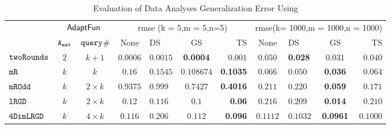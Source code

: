 {\footnotesize
\begin {table}[t]
        \vspace{-0.5cm}
        \caption{Evaluation of Data Analyses Generalization Error Using {\THESYSTEM}}
    \vspace{-0.4cm}
        \label{tb:adapt-generalization}
        \begin{center}
        \centering
{
        \begin{tabular}{|| >{\tiny}l || c | c || c | l | c | r || c | l | c | r || }
                \hhline{t|:=========== :t:|}
        \multirow{2}{*}{Program $c$}
         & \multicolumn{2}{c||}{$\textsf{AdaptFun}$}
         & \multicolumn{4}{c||}{rmse (k = 5,m = 5,n=5)}  & \multicolumn{4}{c||}{rmse(k= 1000,m = 1000,n = 1000)}  \\ 
         \hhline{||~--||----||----||}
         & {${\mathtt{A_{est}}}$ } & {${\tt query}$\# }  & None  & DS & GS & TS & None & DS & GS & TS \\ 
         \hline \hline
        $  \mathtt{ twoRounds }$ & $ 2 $ & $  k + 1 $  & $0.0006$   & {{$0.0015$}} & \textbf{0.0004} & {$0.001$}& $0.050$   & {\textbf{0.028}} & {$0.031$} & $0.040$  \\
        \hhline{||-||---||-||--||----||}
         $  \mathtt{ mR}$ & $k$ & $k$  & $0.16$   & $0.1545$  & $0.108674 $ & \textbf{0.1035}  & $0.066$   & $0.050$ & {\textbf{0.036}} & $0.064$  \\
         \hhline{||-||---||-||--||----||}
         $  \mathtt{ mROdd }$ & $ k $   & $  2 \times k $ & $0.9375$   & $0.999$ & $0.7427$ & {\textbf{0.4016}} & $0.211$   & $0.220$ & {\textbf{0.059}} & $0.171$  \\
         \hhline{||-||---||-||--||----||}
         $  \mathtt{ lRGD }$ & $ k $ & $  2\times k $  & $0.12$   & $0.116$ & $ 0.1 $ & \textbf{0.06} & $0.216$   & $0.209$ & \textbf{0.014} & $0.210$  \\
         \hhline{||-||---||-||--||----||}
         $  \mathtt{ 4DimLRGD }$ & $ k $ & $  4\times k $   & $0.116$   & $0.206$ & $0.112 $ & \textbf{0.096} & $0.1112$   & $0.1032$ & \textbf{0.0961} & $0.1000$  \\

\end{tabular}}
\end{center}
\end{table}}
